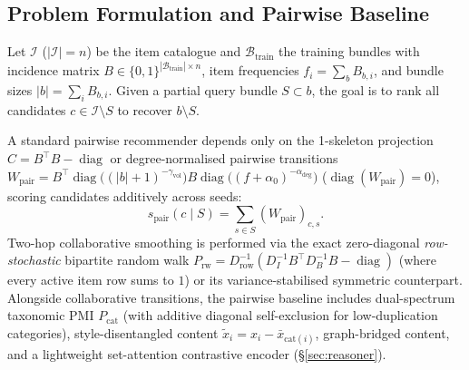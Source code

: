 \subsection{Problem Formulation and Pairwise Baseline}
\label{sec:prob}
Let $\mathcal{I}$ ($|\mathcal{I}|=n$) be the item catalogue and $\mathcal{B}_{\text{train}}$ the training bundles
with incidence matrix $B\in\{0,1\}^{|\mathcal{B}_{\text{train}}|\times n}$, item frequencies
$f_i = \sum_{b} B_{b,i}$, and bundle sizes $|b| = \sum_i B_{b,i}$. Given a partial query bundle $S \subset b$,
the goal is to rank all candidates $c \in \mathcal{I}\setminus S$ to recover $b\setminus S$.

A standard pairwise recommender depends only on the 1-skeleton projection $C = B^{\!\top}B - \operatorname{diag}$
or degree-normalised pairwise transitions
$W_{\text{pair}} = B^{\!\top}\operatorname{diag}\big((|b|+1)^{-\gamma_{\text{vol}}}\big)B\operatorname{diag}\big((f+\alpha_0)^{-\alpha_{\text{deg}}}\big)$
($\operatorname{diag}(W_{\text{pair}})=0$), scoring candidates additively across seeds:
\begin{equation}
  s_{\text{pair}}(c\mid S) = \sum_{s\in S} (W_{\text{pair}})_{c,s}.
  \label{eq:pair}
\end{equation}
Two-hop collaborative smoothing is performed via the exact zero-diagonal \emph{row-stochastic} bipartite random
walk $P_{\text{rw}} = D_{\text{row}}^{-1}(D_I^{-1}B^{\!\top}D_B^{-1}B - \operatorname{diag})$ (where every active
item row sums to $1$) or its variance-stabilised symmetric counterpart. Alongside collaborative transitions, the
pairwise baseline includes dual-spectrum taxonomic PMI $P_{\text{cat}}$ (with additive diagonal self-exclusion for
low-duplication categories), style-disentangled content $\tilde{x}_i = x_i - \bar{x}_{\text{cat}(i)}$,
graph-bridged content, and a lightweight set-attention contrastive encoder (\S\ref{sec:reasoner}).

